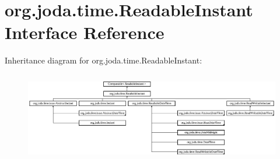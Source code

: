 \hypertarget{interfaceorg_1_1joda_1_1time_1_1_readable_instant}{\section{org.\-joda.\-time.\-Readable\-Instant Interface Reference}
\label{interfaceorg_1_1joda_1_1time_1_1_readable_instant}
}
Inheritance diagram for org.\-joda.\-time.\-Readable\-Instant\-:\begin{figure}[H]
\begin{center}
\leavevmode
\includegraphics[height=3.947137cm]{interfaceorg_1_1joda_1_1time_1_1_readable_instant}
\end{center}
\end{figure}
